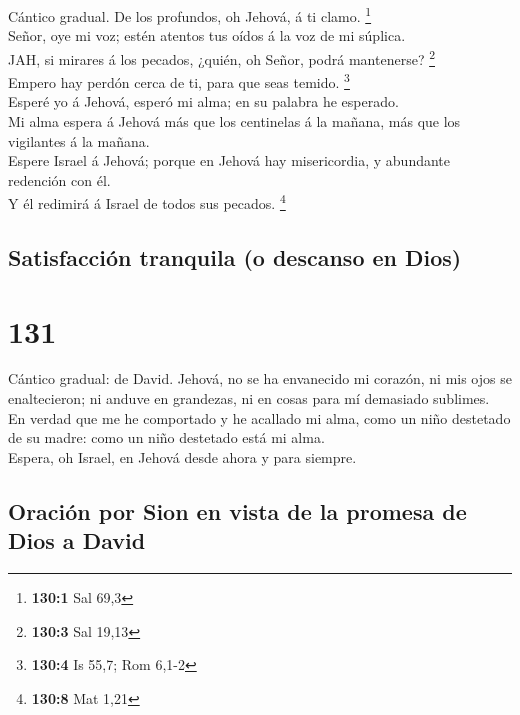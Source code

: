  Cántico gradual. De los profundos, oh Jehová, á ti clamo.
\footnote{\textbf{130:1} Sal 69,3}\\
 Señor, oye mi voz; estén atentos tus oídos á la voz de mi
súplica.\\
 JAH, si mirares á los pecados, ¿quién, oh Señor, podrá
mantenerse? \footnote{\textbf{130:3} Sal 19,13}\\
 Empero hay perdón cerca de ti, para que seas temido.
\footnote{\textbf{130:4} Is 55,7; Rom 6,1-2}\\
 Esperé yo á Jehová, esperó mi alma; en su palabra he
esperado.\\
 Mi alma espera á Jehová más que los centinelas á la
mañana, más que los vigilantes á la mañana.\\
 Espere Israel á Jehová; porque en Jehová hay
misericordia, y abundante redención con él.\\
 Y él redimirá á Israel de todos sus pecados. \footnote{\textbf{130:8}
  Mat 1,21}

\hypertarget{satisfacciuxf3n-tranquila-o-descanso-en-dios}{%
\subsection{Satisfacción tranquila (o descanso en
Dios)}\label{satisfacciuxf3n-tranquila-o-descanso-en-dios}}

\hypertarget{section-130}{%
\section{131}\label{section-130}}

 Cántico gradual: de David. Jehová, no se ha envanecido mi
corazón, ni mis ojos se enaltecieron; ni anduve en grandezas, ni en
cosas para mí demasiado sublimes.\\
 En verdad que me he comportado y he acallado mi alma,
como un niño destetado de su madre: como un niño destetado está mi
alma.\\
 Espera, oh Israel, en Jehová desde ahora y para siempre.

\hypertarget{oraciuxf3n-por-sion-en-vista-de-la-promesa-de-dios-a-david}{%
\subsection{Oración por Sion en vista de la promesa de Dios a
David}\label{oraciuxf3n-por-sion-en-vista-de-la-promesa-de-dios-a-david}}

